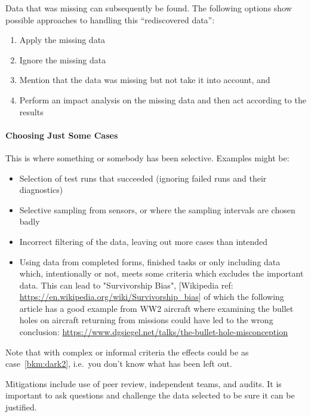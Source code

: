 Data that was missing can subsequently be found. The following options show possible approaches to handling this “rediscovered data”:
\begin{enumerate}[label=\color{dsiwgAccentColour}\roman*)]
  \item Apply the missing data
  \item Ignore the missing data 
  \item Mention that the data was missing but not take it into account, and 
  \item Perform an impact analysis on the missing data and then act according to the results
\end{enumerate}

\paragraph{Choosing Just Some Cases}\label{bkm:dark3}
This is where something or somebody has been selective. Examples might be:
\begin{itemize}
\item Selection of test runs that succeeded (ignoring failed runs and their diagnostics) 
  \item Selective sampling from sensors, or where the sampling intervals are chosen badly
  \item Incorrect filtering of the data, leaving out more cases than intended
  \item Using data from completed forms, finished tasks or only including data which,
    intentionally or not, meets some criteria which excludes the important data.
    This can lead to "Survivorship Bias",
    [Wikipedia ref:
      \href{https://en.wikipedia.org/wiki/Survivorship\_bias}
           {https://en.wikipedia.org/wiki/Survivorship\_bias}]
    of which the following article has a good example from WW2 aircraft where examining the bullet
    holes on aircraft returning from missions could have led to the wrong conclusion:
    \href{https://www.dgsiegel.net/talks/the-bullet-hole-misconception}
         {https://www.dgsiegel.net/talks/the-bullet-hole-misconception}
\end{itemize}
Note that with complex or informal criteria the effects could be as case~\ref{bkm:dark2}, i.e.\ you don’t know what has been left out.

Mitigations include use of peer review, independent teams, and audits. It is important to ask questions and challenge the data selected to be sure it can be justified.

